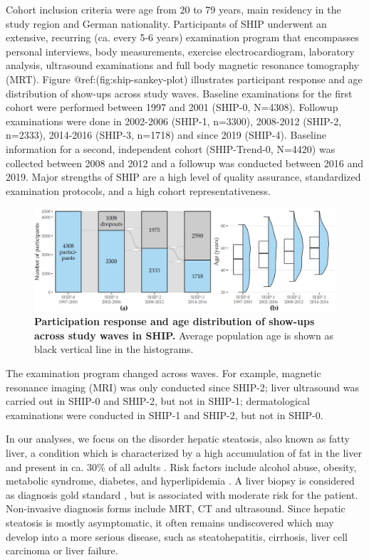 \documentclass[
  oneside]{book}
\begin{document}
Cohort inclusion criteria were age from 20 to 79 years, main residency in the study region and German nationality.
Participants of SHIP underwent an extensive, recurring (ca. every 5-6 years) examination program that encompasses personal interviews, body measurements, exercise electrocardiogram, laboratory analysis, ultrasound examinations and full body magnetic resonance tomography (MRT).
Figure @ref:(fig:ship-sankey-plot) illustrates participant response and age distribution of show-ups across study waves.
Baseline examinations for the first cohort were performed between 1997 and 2001 (SHIP-0, N=4308).
Followup examinations were done in 2002-2006 (SHIP-1, n=3300), 2008-2012 (SHIP-2, n=2333), 2014-2016 (SHIP-3, n=1718) and since 2019 (SHIP-4).
Baseline information for a second, independent cohort (SHIP-Trend-0, N=4420) was collected between 2008 and 2012 and a followup was conducted between 2016 and 2019.
Major strengths of SHIP are a high level of quality assurance, standardized examination protocols, and a high cohort representativeness.



\begin{figure}

{\centering \includegraphics[width=1\linewidth]{figures/02-ship-sankey} 

}

\caption{\textbf{Participation response and age distribution of show-ups across study waves in SHIP.} Average population age is shown as black vertical line in the histograms.}\label{fig:02-ship-sankey}
\end{figure}

The examination program changed across waves.
For example, magnetic resonance imaging (MRI) was only conducted since SHIP-2; liver ultrasound was carried out in SHIP-0 and SHIP-2, but not in SHIP-1; dermatological examinations were conducted in SHIP-1 and SHIP-2, but not in SHIP-0.

In our analyses, we focus on the disorder hepatic steatosis, also known as fatty liver, a condition which is characterized by a high accumulation of fat in the liver and present in ca. 30\% of all adults \autocite{Voelzke:SHIP11,volzke2005hepatic}.
Risk factors include alcohol abuse, obesity, metabolic syndrome, diabetes, and hyperlipidemia \autocite{antunes2019fatty}.
A liver biopsy is considered as diagnosis gold standard \autocite{antunes2019fatty}, but is associated with moderate risk for the patient.
Non-invasive diagnosis forms include MRT, CT and ultrasound.
Since hepatic steatosis is mostly asymptomatic, it often remains undiscovered which may develop into a more serious disease, such as steatohepatitis, cirrhosis, liver cell carcinoma or liver failure.
\end{document}
